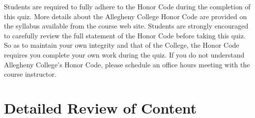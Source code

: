 \documentclass[11pt]{article}
\begin{document}
Students are required to fully adhere to the Honor Code during the completion of
this quiz. More details about the Allegheny College Honor Code are provided on
the syllabus available from the course web site. Students are strongly
encouraged to carefully review the full statement of the Honor Code before
taking this quiz. So as to maintain your own integrity and that of the College,
the Honor Code requires you complete your own work during the quiz. If you do
not understand Allegheny College's Honor Code, please schedule an office hours
meeting with the course instructor.




\section*{Detailed Review of Content}
\end{document}
